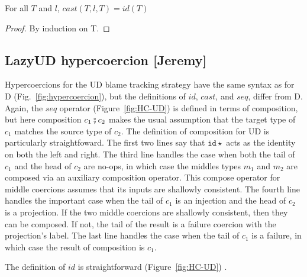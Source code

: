 \documentclass[acmsmall,review,anonymous]{acmart}\settopmatter{printfolios=true,printccs=false,printacmref=false}
\newcommand{\figref}[1]{Fig.~\ref{#1}}
\newcommand{\lazyUD}{Lazy\;UD}
\newcommand{\hyperCoercionI}[0]{\mathtt{id\star}}
\begin{document}
\begin{proposition}
  For all $T$ and $l$, $cast(T,l,T) = id(T) $
\end{proposition}
\begin{proof}
  By induction on T.
\end{proof}

\subsection{\lazyUD{} hypercoercion [Jeremy]}
\label{sec:lud-hc}

Hypercoercions for the UD blame tracking strategy have the same syntax
as for D (\figref{fig:hypercoercion}), but the definitions of $id$,
$cast$, and $seq$, differ from D.  Again, the $seq$ operator
(Figure~\ref{fig:HC-UD}) is defined in terms of composition, but here
composition $c_1 \fatsemi c_2$ makes the usual assumption that the
target type of $c_1$ matches the source type of $c_2$.  The definition
of composition for UD is particularly straightfoward. The first two
lines say that $\hyperCoercionI$ acts as the identity on both the left
and right. The third line handles the case when both the tail of $c_1$
and the head of $c_2$ are no-ops, in which case the middles types
$m_1$ and $m_2$ are composed via an auxiliary composition
operator. This compose operator for middle coercions assumes that its
inputs are shallowly consistent.  The fourth line handles the
important case when the tail of $c_1$ is an injection and the head of
$c_2$ is a projection. If the two middle coercions are shallowly
consistent, then they can be composed. If not, the tail of the result
is a failure coercion with the projection's label.  The last line
handles the case when the tail of $c_1$ is a failure, in which case
the result of composition is $c_1$.


The definition of $id$ is straightforward (Figure~\ref{fig:HC-UD}) .
\end{document}
